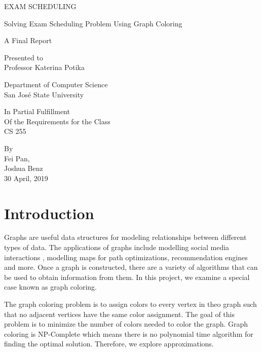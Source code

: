 \documentclass[12]{article}
\begin{document}
\begin{titlepage}


\setlength{\parindent}{0pt}
    \vspace*{-3.8\baselineskip}
    \MakeUppercase{{\tiny  Exam Scheduling}} \hfill 
    \begin{center}
    
    \vfill
     Solving Exam Scheduling Problem  Using Graph Coloring
\\
    \vfill
    
    A  Final Report\\
    \vfill
    
    Presented to  \\
    Professor Katerina Potika\\
    \vfill
    
    Department of Computer Science\\
    San Jos\'e State University\\
    \vfill
    
    In Partial Fulfillment\\
    Of the Requirements for the Class\\
    CS 255\\
    \vfill
    
    By\\ 
    Fei Pan,\\
    Joshua Benz\\
    30 April, 2019\\
\end{center}
\end{titlepage}

\tableofcontents
\thispagestyle{mypagestyle}
\clearpage
{}
\setcounter{page}{1}
\setlength{\parindent}{4em}
\renewcommand{\baselinestretch}{1.5}

\section{Introduction}
	Graphs are useful data structures for modeling relationships between different types of data. The applications of graphs include modelling social media interactions , modelling maps for path optimizations, recommendation engines and more. Once a graph is constructed, there are a variety of algorithms that can be used to obtain information from them. In this project, we examine a special case known as graph coloring.

The graph coloring problem is to assign colors to every vertex in theo graph such that no adjacent vertices have the same color assignment. The goal of this problem is to minimize the number of colors needed to color the graph. Graph coloring is NP-Complete which means there is no polynomial time algorithm for finding the optimal solution. Therefore, we explore approximations. 
\end{document}
